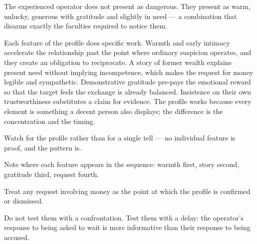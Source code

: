 


\begin{core}
The experienced operator does not present as dangerous. They present as warm, unlucky, generous with gratitude and slightly in need --- a combination that disarms exactly the faculties required to notice them.
\end{core}

\begin{mechanism}
Each feature of the profile does specific work. Warmth and early intimacy accelerate the relationship past the point where ordinary suspicion operates, and they create an obligation to reciprocate. A story of former wealth explains present need without implying incompetence, which makes the request for money legible and sympathetic. Demonstrative gratitude pre-pays the emotional reward so that the target feels the exchange is already balanced. Insistence on their own trustworthiness substitutes a claim for evidence. The profile works because every element is something a decent person also displays; the difference is the concentration and the timing.
\end{mechanism}

\begin{application}
  \item Watch for the profile rather than for a single tell --- no individual feature is proof, and the pattern is.
  \item Note where each feature appears in the sequence: warmth first, story second, gratitude third, request fourth.
  \item Treat any request involving money as the point at which the profile is confirmed or dismissed.
  \item Do not test them with a confrontation. Test them with a delay: the operator's response to being asked to wait is more informative than their response to being accused.
\end{application}


